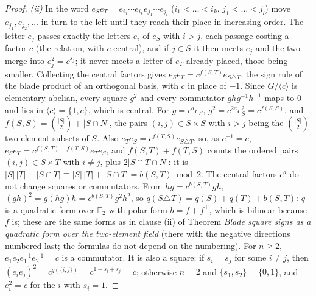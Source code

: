 \documentclass[11pt]{article}
\theoremstyle{definition}
\theoremstyle{plain}
\begin{document}
\begin{proof}
\emph{(ii)} In the word $e_{S}e_{T} = e_{i_{1}}\cdots e_{i_{k}}e_{j_{1}}\cdots e_{j_{l}}$ ($i_{1} < \dots < i_{k}$, $j_{1} < \dots < j_{l}$) move $e_{j_{1}}, e_{j_{2}}, \dots$ in turn to the left until they reach their place in increasing order. The letter $e_{j}$ passes exactly the letters $e_{i}$ of $e_{S}$ with $i > j$, each passage costing a factor $c$ (the relation, with $c$ central), and if $j \in S$ it then meets $e_{j}$ and the two merge into $e_{j}^{2} = c^{s_{j}}$; it never meets a letter of $e_{T}$ already placed, those being smaller. Collecting the central factors gives $e_{S}e_{T} = c^{f(S,T)}e_{S \triangle T}$, the sign rule of the blade product of an orthogonal basis, with $c$ in place of $-1$. Since $G/\langle c\rangle$ is elementary abelian, every square $g^{2}$ and every commutator $ghg^{-1}h^{-1}$ maps to $0$ and lies in $\langle c\rangle = \{1, c\}$, which is central. For $g = c^{a}e_{S}$, $g^{2} = c^{2a}e_{S}^{2} = c^{f(S,S)}$, and $f(S,S) = \binom{|S|}{2} + |S \cap N|$, the pairs $(i, j) \in S \times S$ with $i > j$ being the $\binom{|S|}{2}$ two-element subsets of $S$. Also $e_{T}e_{S} = c^{f(T,S)}e_{S \triangle T}$, so, as $c^{-1} = c$, $e_{S}e_{T} = c^{f(S,T) + f(T,S)}e_{T}e_{S}$, and $f(S,T) + f(T,S)$ counts the ordered pairs $(i, j) \in S \times T$ with $i \ne j$, plus $2|S \cap T \cap N|$: it is $|S|\,|T| - |S \cap T| \equiv |S|\,|T| + |S \cap T| = b(S,T) \bmod 2$. The central factors $c^{a}$ do not change squares or commutators. From $hg = c^{b(S,T)}gh$, $(gh)^{2} = g(hg)h = c^{b(S,T)}g^{2}h^{2}$, so $q(S \triangle T) = q(S) + q(T) + b(S,T)$: $q$ is a quadratic form over $\mathbb{F}_{2}$ with polar form $b = f + f^{\top}$, which is bilinear because $f$ is; these are the same forms as in clause (ii) of Theorem \emph{Blade square signs as a quadratic form over the two-element field} (there with the negative directions numbered last; the formulas do not depend on the numbering). For $n \ge 2$, $e_{1}e_{2}e_{1}^{-1}e_{2}^{-1} = c$ is a commutator. It is also a square: if $s_{i} = s_{j}$ for some $i \ne j$, then $(e_{i}e_{j})^{2} = c^{q(\{i, j\})} = c^{1 + s_{i} + s_{j}} = c$; otherwise $n = 2$ and $\{s_{1}, s_{2}\} = \{0, 1\}$, and $e_{i}^{2} = c$ for the $i$ with $s_{i} = 1$.


\end{proof}
\end{document}
